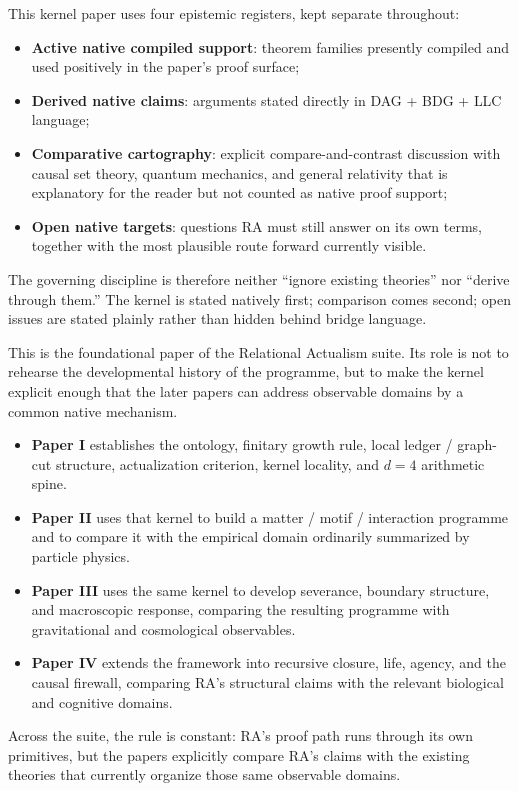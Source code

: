 \documentclass[11pt]{article}
\begin{document}
\begin{tcolorbox}[title=Epistemic Status of This Paper,colback=gray!5,colframe=gray!60]
This kernel paper uses four epistemic registers, kept separate throughout:
\begin{itemize}[nosep]
    \item \textbf{Active native compiled support}: theorem families presently compiled and used positively in the paper's proof surface;
    \item \textbf{Derived native claims}: arguments stated directly in DAG + BDG + LLC language;
    \item \textbf{Comparative cartography}: explicit compare-and-contrast discussion with causal set theory, quantum mechanics, and general relativity that is explanatory for the reader but not counted as native proof support;
    \item \textbf{Open native targets}: questions RA must still answer on its own terms, together with the most plausible route forward currently visible.
\end{itemize}
The governing discipline is therefore neither ``ignore existing theories'' nor ``derive through them.'' The kernel is stated natively first; comparison comes second; open issues are stated plainly rather than hidden behind bridge language.
\end{tcolorbox}

\begin{tcolorbox}[title=Place of This Paper in the RA Suite,colback=gray!5,colframe=gray!60]
This is the foundational paper of the Relational Actualism suite. Its role is not to rehearse the developmental history of the programme, but to make the kernel explicit enough that the later papers can address observable domains by a common native mechanism.
\begin{itemize}[nosep]
    \item \textbf{Paper I} establishes the ontology, finitary growth rule, local ledger / graph-cut structure, actualization criterion, kernel locality, and $d=4$ arithmetic spine.
    \item \textbf{Paper II} uses that kernel to build a matter / motif / interaction programme and to compare it with the empirical domain ordinarily summarized by particle physics.
    \item \textbf{Paper III} uses the same kernel to develop severance, boundary structure, and macroscopic response, comparing the resulting programme with gravitational and cosmological observables.
    \item \textbf{Paper IV} extends the framework into recursive closure, life, agency, and the causal firewall, comparing RA's structural claims with the relevant biological and cognitive domains.
\end{itemize}
Across the suite, the rule is constant: RA's proof path runs through its own primitives, but the papers explicitly compare RA's claims with the existing theories that currently organize those same observable domains.
\end{tcolorbox}
\end{document}
